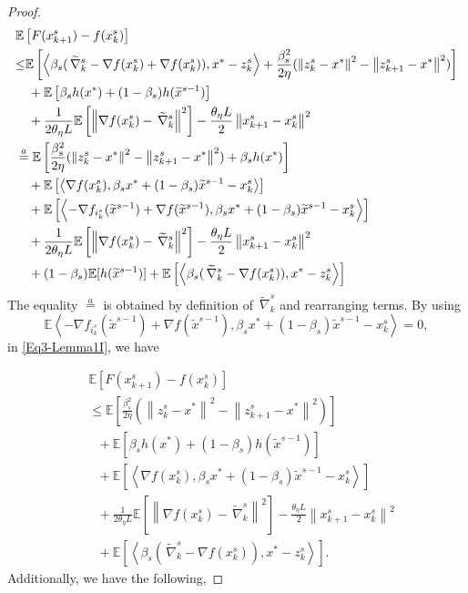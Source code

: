 \documentclass{article}
\newcommand*{\E}{\mathbb{E}}
\newcommand*{\VRG}{\,\widetilde{\nabla}_k^s}
\newcommand{\norm}[1]{\left\lVert#1\right\rVert}
\newcommand{\Iprod}[2]{\left\langle #1,#2\right\rangle}
\theoremstyle{definition}
\theoremstyle{remark}
\begin{document}
\begin{proof}
\begin{gather}\label{Eq3-Lemma1I}
\begin{split}
&\E\left[F(x_{k+1}^s) -f(x_{k}^s)\right]\\
&{\leq}\E\left[\Iprod{\beta_s(\VRG-\nabla f(x_{k}^s)+\nabla f(x_{k}^s))}{x^* - z_{k}^s}+{\frac{\beta_s^2}{2\eta}}(\norm{z_{k}^s-x^*}^2-\norm{z_{k+1}^s-x^*}^2)\right]\\
&~~~+\E\left[\beta_s h(x^*)+(1-\beta_s) h(\widetilde{x}^{s-1})\right]\\
&~~~+\frac{1}{2\theta_{\eta} L}\E\left[\norm{\nabla f(x_{k}^s)-\VRG}^2\right]-\frac{\theta_{\eta} L}{2}\norm{x_{k+1}^s-x_{k}^s}^2\\
& \stackrel{a}{=} \E\left[{\frac{ \beta_s^2}{2\eta}}(\norm{z_{k}^s-x^*}^2-\norm{z_{k+1}^s-x^*}^2)+\beta_sh(x^*)\right]\\
&~~~+\E\left[\Iprod{\nabla f(x_{k}^s)}{\beta_sx^*+(1-\beta_s)\widetilde{x}^{s-1}-{x}^{s}_{k}}\right]\\
&~~~+\E\left[\Iprod{-\nabla f_{i_k^s}(\widetilde{x}^{s-1})+\nabla f(\widetilde{x}^{s-1})}{\beta_sx^*+(1-\beta_s)\widetilde{x}^{s-1}-x_{k}^{s}}\right]\\
&~~~+\frac{1}{2\theta_{\eta} L}\E\left[\norm{\nabla f(x_{k}^s)-\VRG}^2\right]-\frac{\theta_{\eta} L}{2}\norm{x_{k+1}^s-x_{k}^s}^2\\
&~~~+(1-\beta_s) \E[h(\widetilde{x}^{s-1})]+\E\left[\Iprod{\beta_s(\VRG-\nabla f(x_{k}^s))}{x^* - z_{k}^s}\right]
\end{split}
\raisetag{18pt}
\end{gather}
The equality $\stackrel{a}{=}$ is obtained by definition of $\VRG$ and rearranging terms. By using    
\[
\E\Iprod{-\nabla f_{i_k^s}(\widetilde{x}^{s-1})+\nabla f(\widetilde{x}^{s-1})}{\beta_sx^*+(1-\beta_s)\widetilde{x}^{s-1}-x_{k}^{s}}=0,
\]
in \eqref{Eq3-Lemma1I}, we have

\begin{equation}\label{Eq3-Lemma1}
\begin{split}
&\E\left[F(x_{k+1}^s) -f(x_{k}^s)\right]\\
&\leq\E\left[{\frac{ \beta_s^2}{2\eta}}(\norm{z_{k}^s-x^*}^2-\norm{z_{k+1}^s-x^*}^2)\right]\\
&~~~+\E\left[\beta_sh(x^*)+(1-\beta_s) h(\widetilde{x}^{s-1})\right]\\
&~~~+\E\left[\Iprod{\nabla f(x_{k}^s)}{\beta_sx^*+(1-\beta_s)\widetilde{x}^{s-1}-{x}^{s}_{k}}\right]\\
&~~~+\frac{1}{2\theta_{\eta} L}\E\left[\norm{\nabla f(x_{k}^s)-\VRG}^2\right]-\frac{\theta_{\eta} L}{2}\norm{x_{k+1}^s-x_{k}^s}^2\\
&~~~+\E\left[\Iprod{\beta_s(\VRG-\nabla f(x_{k}^s))}{x^* - z_{k}^s}\right].
\end{split}
\end{equation}
Additionally, we have the following,


\end{proof}
\end{document}
